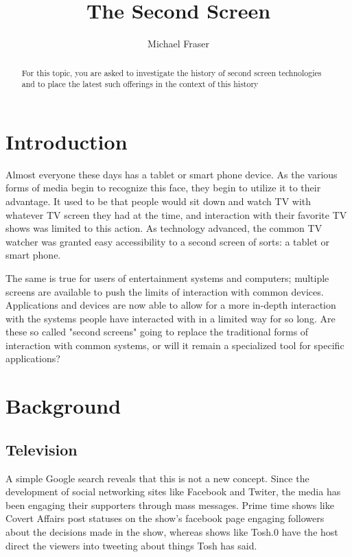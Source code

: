 \documentclass[11pt, oneside]{article}
\begin{document}
\title{The Second Screen}
\author{Michael Fraser}
\maketitle

\begin{abstract}
For this topic, 
you are asked to investigate the history of second 
screen technologies and to place the latest such 
offerings in the context of this history
\end{abstract}

\tableofcontents

\section{Introduction}
Almost everyone these days has a tablet or smart phone device. As the various forms of media begin to recognize this face, they begin to utilize it to their advantage. It used to be that people would sit down and watch TV with whatever TV screen they had at the time, and interaction with their favorite TV shows was limited to this action. As technology advanced, the common TV watcher was granted easy accessibility to a second screen of sorts: a tablet or smart phone. 

The same is true for users of entertainment systems and computers; multiple screens are available to push the limits of interaction with common devices. Applications and devices are now able to allow for a more in-depth interaction with the systems people have interacted with in a limited way for so long. Are these so called "second screens" going to replace the traditional forms of interaction with common systems, or will it remain a specialized tool for specific applications?


\section{Background}
\subsection{Television}
A simple Google search reveals that this is not a new concept. Since the development of social networking sites like Facebook and Twiter, the media has been engaging their supporters through mass messages. Prime time shows like Covert Affairs post statuses on the show's facebook page engaging followers about the decisions made in the show, whereas shows like Tosh.0 have the host direct the viewers into tweeting about things Tosh has said. 
\end{document}
